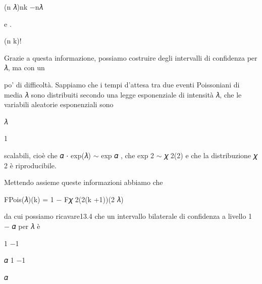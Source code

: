 \documentclass[a4paper,portrait,12pt]{article}
\begin{document}
\begin{flushleft}
(n 𝜆)nk $-$n𝜆
\end{flushleft}


\begin{flushleft}
e .
\end{flushleft}


\begin{flushleft}
(n k)!
\end{flushleft}





\begin{flushleft}
Grazie a questa informazione, possiamo costruire degli intervalli di confidenza per 𝜆, ma con un
\end{flushleft}


\begin{flushleft}
po' di difficolt\`{a}. Sappiamo che i tempi d'attesa tra due eventi Poissoniani di media 𝜆 sono distribuiti secondo una legge esponenziale di intensit\`{a} 𝜆, che le variabili aleatorie esponenziali sono
\end{flushleft}


\begin{flushleft}
𝜆
\end{flushleft}


1


\begin{flushleft}
scalabili, cio\`{e} che 𝛼 ⋅ exp(𝜆) $\sim$ exp 𝛼 , che exp 2 $\sim$ 𝜒 2(2) e che la distribuzione 𝜒 2 \`{e} riproducibile.
\end{flushleft}


\begin{flushleft}
Mettendo assieme queste informazioni abbiamo che
\end{flushleft}


\begin{flushleft}
FPois(𝜆)(k) = 1 $-$ F𝜒 2(2(k +1))(2 𝜆)
\end{flushleft}


\begin{flushleft}
da cui possiamo ricavare13.4 che un intervallo bilaterale di confidenza a livello 1 $-$ 𝛼 per 𝜆 \`{e}
\end{flushleft}


1 $-$1


\begin{flushleft}
𝛼 1 $-$1
\end{flushleft}


\begin{flushleft}
𝛼
\end{flushleft}
\end{document}
